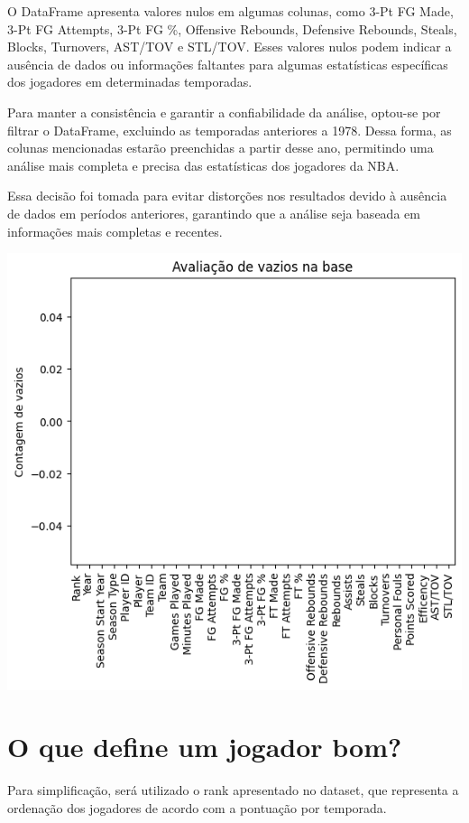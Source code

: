 \documentclass[
]{book}
\begin{document}
O DataFrame apresenta valores nulos em algumas colunas, como 3-Pt FG Made, 3-Pt FG Attempts, 3-Pt FG \%, Offensive Rebounds, Defensive Rebounds, Steals, Blocks, Turnovers, AST/TOV e STL/TOV. Esses valores nulos podem indicar a ausência de dados ou informações faltantes para algumas estatísticas específicas dos jogadores em determinadas temporadas.

Para manter a consistência e garantir a confiabilidade da análise, optou-se por filtrar o DataFrame, excluindo as temporadas anteriores a 1978. Dessa forma, as colunas mencionadas estarão preenchidas a partir desse ano, permitindo uma análise mais completa e precisa das estatísticas dos jogadores da NBA.

Essa decisão foi tomada para evitar distorções nos resultados devido à ausência de dados em períodos anteriores, garantindo que a análise seja baseada em informações mais completas e recentes.

\includegraphics{imagens/2.png}

\hypertarget{o-que-define-um-jogador-bom}{%
\chapter{O que define um jogador bom?}\label{o-que-define-um-jogador-bom}}

Para simplificação, será utilizado o rank apresentado no dataset, que representa a ordenação dos jogadores de acordo com a pontuação por temporada.
\end{document}
